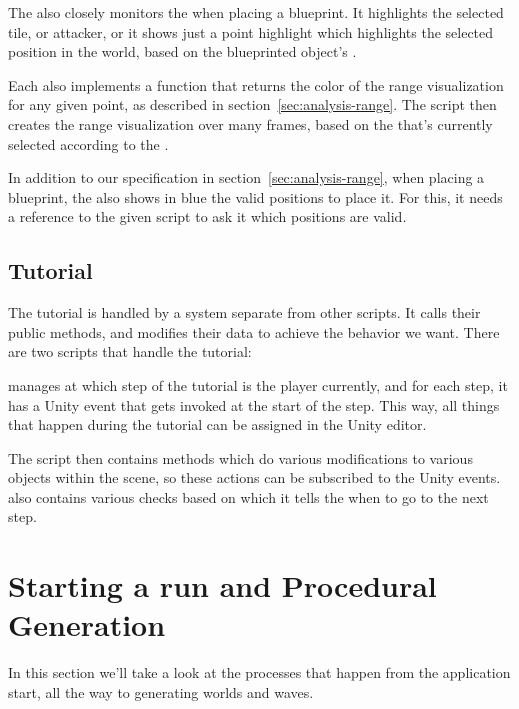 The  also closely monitors the  when placing a blueprint.
It highlights the selected tile, or attacker, or it shows just a point highlight which highlights the selected position in the world, based on the blueprinted object's .

Each  also implements a function that returns the color of the range visualization for any given point, as described in section~\ref{sec:analysis-range}.
The script  then creates the range visualization over many frames, based on the  that's currently selected according to the .

In addition to our specification in section~\ref{sec:analysis-range}, when placing a blueprint, the  also shows in blue the valid positions to place it.
For this, it needs a reference to the given  script to ask it which positions are valid.


\subsection{Tutorial}

The tutorial is handled by a system separate from other scripts.
It calls their public methods, and modifies their data to achieve the behavior we want.
There are two scripts that handle the tutorial:

 manages at which step of the tutorial is the player currently, and for each step, it has a Unity event that gets invoked at the start of the step.
This way, all things that happen during the tutorial can be assigned in the Unity editor.

The script  then contains methods which do various modifications to various objects within the scene, so these actions can be subscribed to the  Unity events.
 also contains various checks based on which it tells the  when to go to the next step.

\section{Starting a run and Procedural Generation}\label{sec:docs-data}

In this section we'll take a look at the processes that happen from the application start, all the way to generating worlds and waves.

